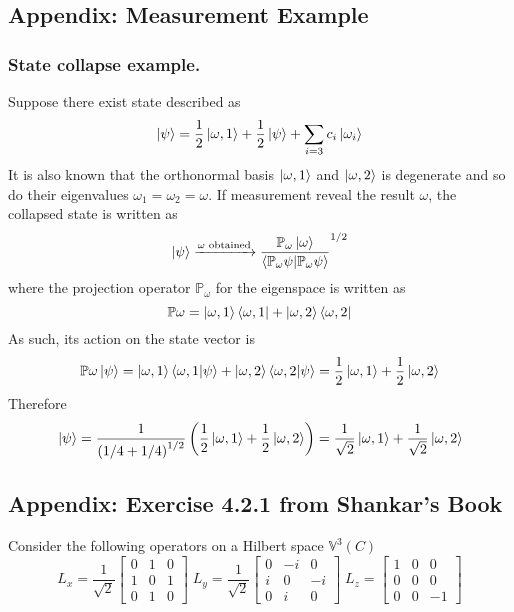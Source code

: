 \documentclass[../../../main.tex]{subfiles}
\begin{document}
\subsection{Appendix: Measurement Example}
\subsubsection{State collapse example.}
Suppose there exist  state described as
\begin{equation*}
    \ket{\psi}=\frac{1 }{2}\ket{\omega,1}+\frac{1 }{2}\ket{\psi}+\sum_{i=3} c_i \ket{\omega_i}
\end{equation*}
It is also known that the orthonormal basis $\ket{\omega,1  }$ and $\ket{\omega,2}$ is degenerate and so do their eigenvalues $\omega_1=\omega_2=\omega$.
If measurement reveal the result $\omega$, the collapsed state is written as
\begin{equation*}
    \ket{\psi}\xrightarrow{\omega\text{ obtained}}\frac{\mathbb{P}_\omega \ket{\omega }}{\braket{\mathbb{P}_\omega\psi|\mathbb{P }_\omega \psi}}^{1/2}
\end{equation*}
where the projection operator $\mathbb{P }_\omega$ for the eigenspace is written as
\begin{equation*}
    \mathbb{P }\omega=\ket{\omega,1}\bra{\omega,1}+\ket{\omega,2}\bra{\omega,2}
\end{equation*}
As such, its action on the state vector is
\begin{equation*}
    \mathbb{P }\omega \ket{\psi}=\ket{\omega,1}\braket{\omega,1|\psi}+\ket{\omega,2}\braket{\omega,2|\psi}
    =\frac{1 }{2 }\ket{\omega,1}+\frac{1 }{2 }\ket{\omega,2}
\end{equation*}
Therefore
\begin{equation*}
    \ket{\psi}=\frac{1}{\left( 1/4+1/4 \right) ^{1/2}}\left(\frac{1 }{2 }\ket{\omega,1}+\frac{1 }{2 }\ket{\omega,2}\right)
    =\frac{1 }{\sqrt{2} }\ket{\omega,1}+\frac{1 }{\sqrt{2} }\ket{\omega,2}
\end{equation*}

\subsection{Appendix: Exercise 4.2.1 from Shankar's Book}
Consider the following operators on a Hilbert space $\mathbb{V}^3(C)$
\begin{equation*}
    L_x=\frac{1 }{\sqrt{2 }}\begin{bmatrix}
        0 & 1 & 0 \\
        1 & 0 & 1 \\
        0 & 1 & 0
    \end{bmatrix}\;
    L_y=\frac{1 }{\sqrt{2 }}\begin{bmatrix}
        0 & -i & 0  \\
        i & 0  & -i \\
        0 & i  & 0
    \end{bmatrix}\;
    L_z= \begin{bmatrix}
        1 & 0 & 0  \\
        0 & 0 & 0  \\
        0 & 0 & -1
    \end{bmatrix}
\end{equation*}
\end{document}
